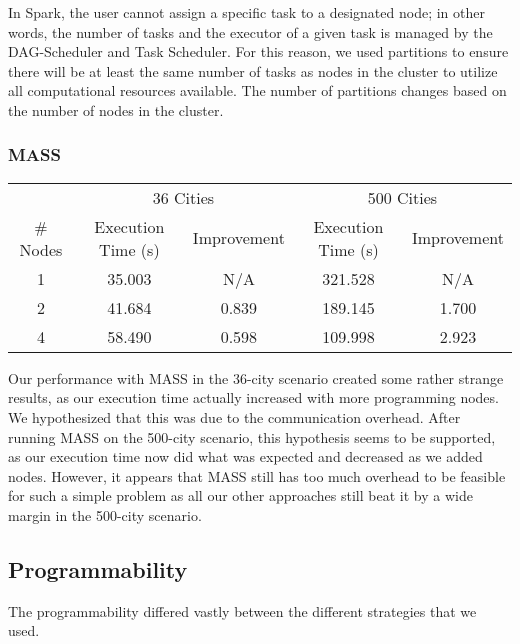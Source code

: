 \documentclass{article}
\begin{document}
				In Spark, the user cannot assign a specific task to a designated node; in other words, the number of tasks and the executor of a given task is managed by the DAG-Scheduler and Task Scheduler. For this reason, we used partitions to ensure there will be at least the same number of tasks as nodes in the cluster to utilize all computational resources available. The number of partitions changes based on the number of nodes in the cluster.\\
    		
    		\subsubsection{MASS} \label{PER_MASS}
        		\begin{minipage}{\linewidth}
                    \centering
        			\begin{tabular}{c|cc|cc}\label{T5}
        				& \multicolumn{2}{c|}{36 Cities} & \multicolumn{2}{c}{500 Cities} \\
        				\# Nodes & Execution Time (s) & Improvement & Execution Time (s) & Improvement\\
        				\hline
        				1	& 35.003	& N/A	&	321.528	& N/A \\
        				2	& 41.684	& 0.839 &	189.145	& 1.700 \\
        				4	& 58.490	& 0.598 &	109.998	& 2.923 \\
        			\end{tabular}
        		\smallskip\smallskip\smallskip\smallskip
                \end{minipage}
            
            	Our performance with MASS in the 36-city scenario created some rather strange results, as our execution time actually increased with more programming nodes. We hypothesized that this was due to the communication overhead. After running MASS on the 500-city scenario, this hypothesis seems to be supported, as our execution time now did what was expected and decreased as we added nodes. However, it appears that MASS still has too much overhead to be feasible for such a simple problem as all our other approaches still beat it by a wide margin in the 500-city scenario. \\
		
		\subsection{Programmability} \label{PROG}
			The programmability differed vastly between the different strategies that we used. \\
			
\end{document}
